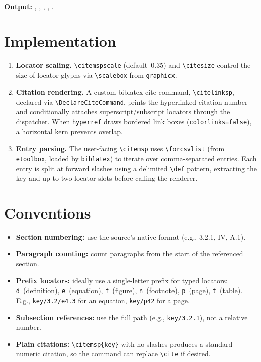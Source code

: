 \documentclass[11pt, a4paper]{article}
\newcommand{\pkg}[1]{\texttt{#1}}
\newcommand{\cmd}[1]{\texttt{\textbackslash #1}}
\begin{document}
\noindent\textbf{Output:}
,\enspace
{},\enspace
{},\enspace
{},\enspace
{}.


\section{Implementation}


\begin{enumerate}[leftmargin=2em]
  \item \textbf{Locator scaling.} \cmd{citemspscale} (default~0.35) and \cmd{citesize} control the size of locator glyphs via \cmd{scalebox} from \pkg{graphicx}.

  \item \textbf{Citation rendering.} A custom biblatex cite command, \cmd{citelinksp}, declared via \verb|\DeclareCiteCommand|, prints the hyperlinked citation number and conditionally attaches superscript/subscript locators through the dispatcher. When \pkg{hyperref} draws bordered link boxes (\texttt{colorlinks=false}), a horizontal kern prevents overlap.

  \item \textbf{Entry parsing.} The user-facing \cmd{citemsp} uses \verb|\forcsvlist| (from \pkg{etoolbox}, loaded by \pkg{biblatex}) to iterate over comma-separated entries. Each entry is split at forward slashes using a delimited \verb|\def| pattern, extracting the key and up to two locator slots before calling the renderer.
\end{enumerate}


\section{Conventions}

\begin{itemize}[leftmargin=2em]
  \item \textbf{Section numbering:} use the source's native format (e.g., 3.2.1, IV, A.1).
  \item \textbf{Paragraph counting:} count paragraphs from the start of the referenced section.
  \item \textbf{Prefix locators:} ideally use a single-letter prefix for typed locators: \texttt{d}~(definition), \texttt{e}~(equation), \texttt{f}~(figure), \texttt{n}~(footnote), \texttt{p}~(page), \texttt{t}~(table). E.g., \texttt{key/3.2/e4.3} for an equation, \texttt{key/p42} for a page.
  \item \textbf{Subsection references:} use the full path (e.g., \texttt{key/3.2.1}), not a relative number.
  \item \textbf{Plain citations:} \verb|\citemsp{key}| with no slashes produces a standard numeric citation, so the command can replace \verb|\cite| if desired.
\end{itemize}
\end{document}
